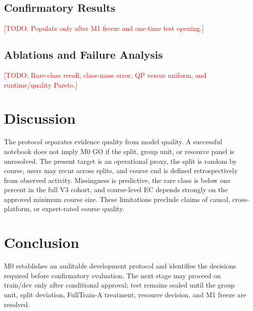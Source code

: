 \documentclass[runningheads]{llncs}
\newcommand{\todoitem}[1]{\par\noindent\textcolor{red}{[TODO: #1]}\par}
\begin{document}
\subsection{Confirmatory Results}
\todoitem{Populate only after M1 freeze and one-time test opening.}
\subsection{Ablations and Failure Analysis}
\todoitem{Rare-class recall, class-mass error, QP versus uniform, and runtime/quality Pareto.}

\section{Discussion}
The protocol separates evidence quality from model quality.  A successful
notebook does not imply M0 GO if the split, group unit, or resource panel is
unresolved.  The present target is an operational proxy, the split is random by
course, users may recur across splits, and course end is defined retrospectively
from observed activity.  Missingness is predictive, the rare class is below one
percent in the full V3 cohort, and course-level EC depends strongly on the
approved minimum course size.  These limitations preclude claims of causal,
cross-platform, or expert-rated course quality.

\section{Conclusion}
M0 establishes an auditable development protocol and identifies the decisions
required before confirmatory evaluation.  The next stage may proceed on
train/dev only after conditional approval; test remains sealed until the group
unit, split deviation, FullTrain-A treatment, resource decision, and M1 freeze
are resolved.



\end{document}
